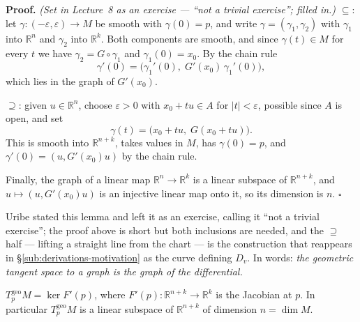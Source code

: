 \documentclass[11pt]{report}
\makeatletter
\newcounter{thmcounter}[section]
\renewenvironment{proof}[1][Proof]{\noindent\textbf{#1.} }{\hfill$\square$\par\vspace{5pt}}
\newcommand{\thmlabel}[1]{\edef\@currentlabel{\arabic{section}.\arabic{thmcounter}}\label{#1}}
\newcommand{\geo}{\mathrm{geo}}
\newcommand{\leeref}[1]{\par\smallskip{\raggedleft\footnotesize\textsc{Lee}:\ #1\par}}
\makeatother
\begin{document}
\begin{proof}
\textit{(Set in Lecture~8 as an exercise --- ``not a trivial exercise''; filled in.)} $\subseteq$: let $\gamma : (-\varepsilon,\varepsilon) \to M$ be smooth with $\gamma(0) = p$, and write $\gamma = (\gamma_1, \gamma_2)$ with $\gamma_1$ into $\mathbb{R}^n$ and $\gamma_2$ into $\mathbb{R}^k$. Both components are smooth, and since $\gamma(t) \in M$ for every $t$ we have $\gamma_2 = G \circ \gamma_1$ and $\gamma_1(0) = x_0$. By the chain rule
\[
\gamma'(0) = \big(\gamma_1'(0),\; G'(x_0)\,\gamma_1'(0)\big),
\]
which lies in the graph of $G'(x_0)$.

$\supseteq$: given $u \in \mathbb{R}^n$, choose $\varepsilon > 0$ with $x_0 + tu \in A$ for $|t| < \varepsilon$, possible since $A$ is open, and set
\[
\gamma(t) = \big(x_0 + tu,\; G(x_0 + tu)\big).
\]
This is smooth into $\mathbb{R}^{n+k}$, takes values in $M$, has $\gamma(0) = p$, and $\gamma'(0) = (u, G'(x_0)u)$ by the chain rule.

Finally, the graph of a linear map $\mathbb{R}^n \to \mathbb{R}^k$ is a linear subspace of $\mathbb{R}^{n+k}$, and $u \mapsto (u, G'(x_0)u)$ is an injective linear map onto it, so its dimension is $n$.
\end{proof}

\begin{rembox}\label{rem:tangent-2}
Uribe stated this lemma and left it as an exercise, calling it ``not a trivial exercise''; the proof above is short but both inclusions are needed, and the $\supseteq$ half --- lifting a straight line from the chart --- is the construction that reappears in \S\ref{sub:derivations-motivation} as the curve defining $D_v$. In words: \emph{the geometric tangent space to a graph is the graph of the differential.}
\end{rembox}

\begin{thmbox}\thmlabel{thm:tangent-kernel}
$T^{\geo}_pM = \ker F'(p)$, where $F'(p) : \mathbb{R}^{n+k} \to \mathbb{R}^k$ is the Jacobian at $p$. In particular $T^{\geo}_pM$ is a linear subspace of $\mathbb{R}^{n+k}$ of dimension $n = \dim M$.
\leeref{Proposition 5.38}
\end{thmbox}
\end{document}
